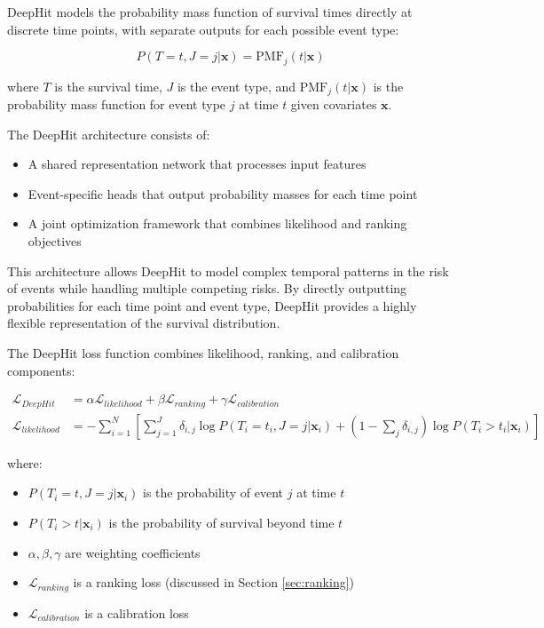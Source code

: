 \begin{definitionbox}[title=DeepHit Model]
  DeepHit models the probability mass function of survival times directly at discrete time points, with separate outputs for each possible event type:

  \begin{equation}
    P(T=t, J=j|\mathbf{x}) = \text{PMF}_j(t|\mathbf{x})
  \end{equation}

  where $T$ is the survival time, $J$ is the event type, and $\text{PMF}_j(t|\mathbf{x})$ is the probability mass function for event type $j$ at time $t$ given covariates $\mathbf{x}$.
\end{definitionbox}

The DeepHit architecture consists of:
\begin{itemize}
\item A shared representation network that processes input features
\item Event-specific heads that output probability masses for each time point
\item A joint optimization framework that combines likelihood and ranking objectives
\end{itemize}

This architecture allows DeepHit to model complex temporal patterns in the risk of events while handling multiple competing risks. By directly outputting probabilities for each time point and event type, DeepHit provides a highly flexible representation of the survival distribution.

\begin{equationbox}[title=DeepHit Loss Function]
  The DeepHit loss function combines likelihood, ranking, and calibration components:

  \begin{align}
    \mathcal{L}_{DeepHit} &= \alpha \mathcal{L}_{likelihood} + \beta \mathcal{L}_{ranking} + \gamma \mathcal{L}_{calibration} \\
    \mathcal{L}_{likelihood} &= -\sum_{i=1}^N \left[ \sum_{j=1}^J \delta_{i,j} \log P(T_i=t_i, J=j|\mathbf{x}_i) + (1-\sum_j \delta_{i,j}) \log P(T_i > t_i|\mathbf{x}_i) \right]
  \end{align}

  where:
  \begin{itemize}
  \item $P(T_i=t, J=j|\mathbf{x}_i)$ is the probability of event $j$ at time $t$
  \item $P(T_i > t|\mathbf{x}_i)$ is the probability of survival beyond time $t$
  \item $\alpha, \beta, \gamma$ are weighting coefficients
  \item $\mathcal{L}_{ranking}$ is a ranking loss (discussed in Section \ref{sec:ranking})
  \item $\mathcal{L}_{calibration}$ is a calibration loss
  \end{itemize}
\end{equationbox}

